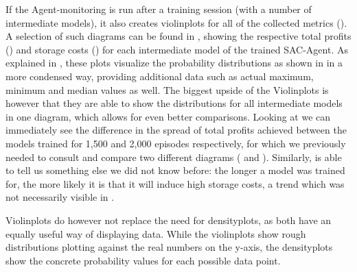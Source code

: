 If the Agent-monitoring is run after a training session (with a number of intermediate models), it also creates violinplots for all of the collected metrics (). A selection of such diagrams can be found in , showing the respective total profits () and storage costs () for each intermediate model of the trained SAC-Agent. As explained in , these plots visualize the probability distributions as shown in  in a more condensed way, providing additional data such as actual maximum, minimum and median values as well. The biggest upside of the Violinplots is however that they are able to show the distributions for all intermediate models in one diagram, which allows for even better comparisons. Looking at  we can immediately see the difference in the spread of total profits achieved between the models trained for 1,500 and 2,000 episodes respectively, for which we previously needed to consult and compare two different diagrams ( and ). Similarly,  is able to tell us something else we did not know before: the longer a model was trained for, the more likely it is that it will induce high storage costs, a trend which was not necessarily visible in .

Violinplots do however not replace the need for densityplots, as both have an equally useful way of displaying data. While the violinplots show rough distributions plotting against the real numbers on the y-axis, the densityplots show the concrete probability values for each possible data point.

